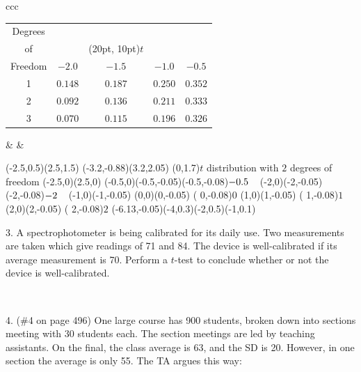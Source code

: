 \documentclass[10pt]{article}
\begin{document}
\begin{tabular}{ccc}
\begin{tabular}{|c|cccc|}\hline
Degrees\vphantom{\LARGE Y} & &&&\\
of      & &\rput(20pt, 10pt){$t$}&&\\
Freedom & $-2.0$ & $-1.5$ & $-1.0$ & $-0.5$\\[3pt]\hline
1       & $0.148$ & $0.187$ & $0.250$ & $0.352$\vphantom{\LARGE Y}\\
2       & $0.092$ & $0.136$ & $0.211$ & $0.333$\\
3       & $0.070$ & $0.115$ & $0.196$ & $0.326$\\\hline
\end{tabular}
&\hspace{1in} &
\begin{pspicture}(-2.5,0.5)(2.5,1.5)
\psframe[linewidth=0.02](-3.2,-0.88)(3.2,2.05)
\rput(0,1.7){$t$ distribution with $2$ degrees of freedom}
\psline{<->}(-2.5,0)(2.5,0)
\psline(-0.5,0)(-0.5,-0.05)\rput[t](-0.5,-0.08){\footnotesize$-0.5\hphantom{-}$}
\psline(-2,0)(-2,-0.05)    \rput[t](-2,-0.08){\footnotesize$-2\hphantom{-}$}
\psline(-1,0)(-1,-0.05)   %
\psline(0,0)(0,-0.05)      \rput[t]( 0,-0.08){\footnotesize$0$}
\psline(1,0)(1,-0.05)      \rput[t]( 1,-0.08){\footnotesize$1$}
\psline(2,0)(2,-0.05)      \rput[t]( 2,-0.08){\footnotesize$2$}
\psbezier{->}(-6.13,-0.05)(-4,0.3)(-2,0.5)(-1,0.1)
\end{pspicture}
\end{tabular}
\bigskip
\bigskip

3. A spectrophotometer is being calibrated for its daily use.  Two measurements are
taken which give readings of 71 and 84.  The device is well-calibrated if its
average measurement is 70.  Perform a $t$-test to conclude whether or not the 
device is well-calibrated.
\vfill
\eject

{\ }

4. (\#4 on page 496) One large course has 900 students, broken down into sections meeting with
30 students each.  The section meetings are led by teaching assistants.  On the final, the
class average is 63, and the SD is 20.  However, in one section the 
average is only 55.  The TA argues this way:
\end{document}
